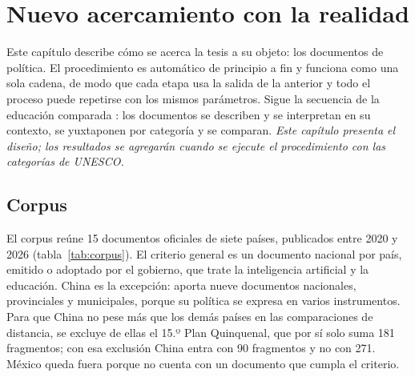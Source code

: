 
\providecommand{\pendiente}[1]{\textbf{[Pendiente: #1]}}

\chapter{Nuevo acercamiento con la realidad}
\label{cap:acercamiento}

Este capítulo describe cómo se acerca la tesis a su objeto: los documentos de política. El
procedimiento es automático de principio a fin y funciona como una sola cadena, de modo que
cada etapa usa la salida de la anterior y todo el proceso puede repetirse con los mismos
parámetros. Sigue la secuencia de la educación comparada \citep{bereday1964comparative,
adick2018bereday}: los documentos se describen y se interpretan en su contexto, se
yuxtaponen por categoría y se comparan. \textit{Este capítulo presenta el diseño; los
resultados se agregarán cuando se ejecute el procedimiento con las categorías de UNESCO.}

\section{Corpus}
\label{sec:corpus}

El corpus reúne 15 documentos oficiales de siete países, publicados entre 2020 y 2026
(tabla~\ref{tab:corpus}). El criterio general es un documento nacional por país, emitido o
adoptado por el gobierno, que trate la inteligencia artificial y la educación. China es la
excepción: aporta nueve documentos nacionales, provinciales y municipales, porque su política se expresa
en varios instrumentos. Para que China no pese más que los demás países en las comparaciones
de distancia, se excluye de ellas el 15.º Plan Quinquenal, que por sí solo suma 181
fragmentos; con esa exclusión China entra con 90 fragmentos y no con 271. México queda fuera
porque no cuenta con un documento que cumpla el criterio.

